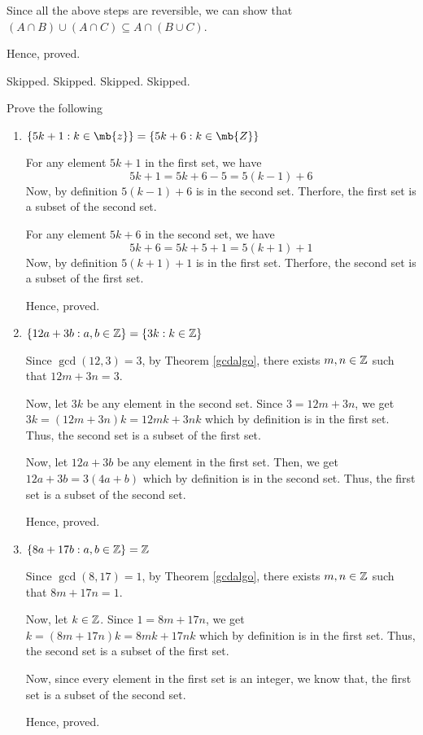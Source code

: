 Since all the above steps are reversible, we can show that
$(A \cap B) \cup (A \cap C) \subseteq A \cap (B \cup C)$.

Hence, proved.
\es


\bp Skipped.\ep
\bp Skipped.\ep
\bp Skipped.\ep
\bp Skipped.\ep

\bp
Prove the following
\begin{enumerate}
	\item $\{5k+1 : k \in \mb{z} \} = \{ 5k + 6 : k \in \mb{Z} \}$

	      \bs
	      For any element $5k+1$ in the first set, we have
	      $$5k + 1 = 5k+6-5 = 5(k-1) + 6$$
	      Now, by definition $5(k-1)+6$ is in the second set.
	      Therfore, the first set is a subset of the second set.

	      For any element $5k+6$ in the second set, we have
	      $$5k+6 = 5k+5+1 = 5(k+1)+1$$
	      Now, by definition $5(k+1)+1$ is in the first set.
	      Therfore, the second set is a subset of the first set.

	      Hence, proved.
	      \es

	\item $\{ 12a + 3b : a, b \in \mathbb{Z} \} = \{ 3k : k \in \mathbb{Z} \}$

	      \bs
	      Since $\gcd(12, 3) = 3$, by Theorem \ref{gcdalgo}, there exists $m, n \in \mathbb{Z}$ such that $12m+3n = 3$.

	      Now, let $3k$ be any element in the second set. Since $3 = 12m + 3n$, we get $3k = (12m+3n)k = 12mk + 3nk$ which by definition is in the first set.
	      Thus, the second set is a subset of the first set.

	      Now, let $12a + 3b$ be any element in the first set. Then, we get $12a+3b = 3(4a+b)$ which by definition is in the second set.
	      Thus, the first set is a subset of the second set.

	      Hence, proved.
	      \es

	\item $\{8a+17b: a, b \in \mathbb{Z} \} = \mathbb{Z}$

	      \bs
	      Since $\gcd(8, 17) = 1$, by Theorem \ref{gcdalgo}, there exists $m, n \in \mathbb{Z}$ such that $8m+17n = 1$.

	      Now, let $k \in \mathbb{Z}$. Since $1 = 8m + 17n$, we get $k = (8m+17n)k = 8mk + 17nk$ which by definition is in the first set.
	      Thus, the second set is a subset of the first set.

	      Now, since every element in the first set is an integer, we know that, the first set is a subset of the second set.

	      Hence, proved.
	      \es
\end{enumerate}
\ep


